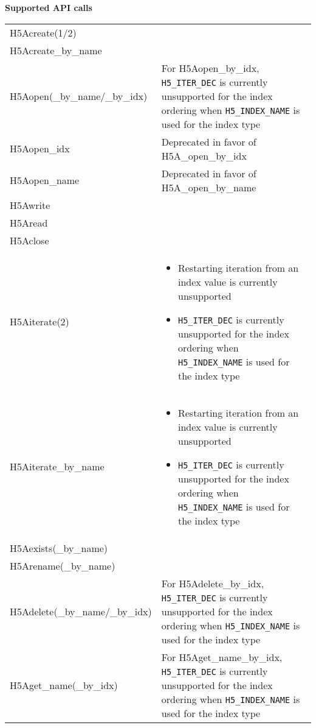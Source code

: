 \documentclass[../users_guide.tex]{subfiles}
\begin{document}
\begin{center}

\textbf{Supported API calls}
\vspace{.2in} \\

\begin{tabularx}{\linewidth}{| X | >{\RaggedRight}X |}
\hline
\rowcolor{lightgray!50}%
\multicolumn{1}{| c |}{\textbf{API call}} & \multicolumn{1}{c |}{\textbf{Notes}} \\ \hline

H5Acreate(1/2) & \\ \hline
H5Acreate\_by\_name & \\ \hline
H5Aopen(\_by\_name/\_by\_idx) & For H5Aopen\_by\_idx, \texttt{H5\_ITER\_DEC} is currently unsupported for the index ordering when \texttt{H5\_INDEX\_NAME} is used for the index type\\ \hline
H5Aopen\_idx & Deprecated in favor of H5A\_open\_by\_idx\\ \hline
H5Aopen\_name & Deprecated in favor of H5A\_open\_by\_name\\ \hline
H5Awrite & \\ \hline
H5Aread & \\ \hline
H5Aclose & \\ \hline
H5Aiterate(2) & \begin{itemize}
                    \item Restarting iteration from an index value is currently unsupported\footnotemark[1]
                    \item \texttt{H5\_ITER\_DEC} is currently unsupported for the index ordering when \texttt{H5\_INDEX\_NAME} is used for the index type
                \end{itemize}\\ \hline
H5Aiterate\_by\_name & \begin{itemize}
                           \item Restarting iteration from an index value is currently unsupported\footnotemark[1]
                           \item \texttt{H5\_ITER\_DEC} is currently unsupported for the index ordering when \texttt{H5\_INDEX\_NAME} is used for the index type
                       \end{itemize}\\ \hline
H5Aexists(\_by\_name) & \\ \hline
H5Arename(\_by\_name) & \\ \hline
H5Adelete(\_by\_name/\_by\_idx) & For H5Adelete\_by\_idx, \texttt{H5\_ITER\_DEC} is currently unsupported for the index ordering when \texttt{H5\_INDEX\_NAME} is used for the index type\\ \hline
H5Aget\_name(\_by\_idx) & For H5Aget\_name\_by\_idx, \texttt{H5\_ITER\_DEC} is currently unsupported for the index ordering when \texttt{H5\_INDEX\_NAME} is used for the index type\\ \hline
\end{tabularx}


\end{center}
\end{document}
